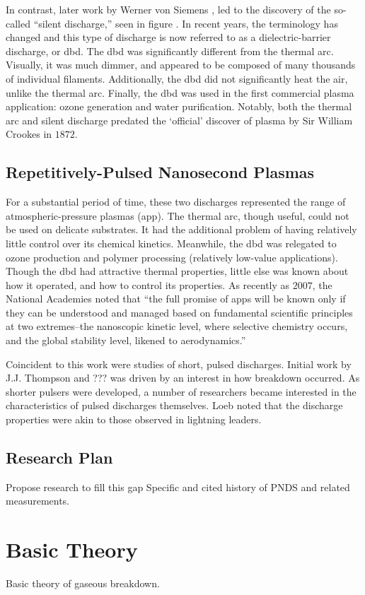 In contrast, later work by Werner von Siemens  , led to the
discovery of the so-called ``silent discharge,'' seen in figure
\missingfigure{}. In recent years, the terminology has changed and this type of
discharge is now referred to as a dielectric-barrier discharge, or \acs{dbd}.
The \acs{dbd} was significantly different from the thermal arc. Visually, it was
much dimmer, and appeared to be composed of many thousands of individual
filaments. Additionally, the \acs{dbd} did not significantly heat the air,
unlike the thermal arc. Finally, the \acs{dbd} was used in the first commercial
plasma application: ozone generation and water purification. Notably, both the
thermal arc and silent discharge predated the `official' discover of plasma by
Sir William Crookes in $1872$.

\subsection{Repetitively-Pulsed Nanosecond Plasmas}

For a substantial period of time, these two  discharges
represented the range of atmospheric-pressure plasmas (\acs{app}). The thermal
arc, though useful, could not be used on delicate substrates. It had the
additional problem of having relatively little control over its chemical
kinetics. Meanwhile, the \acs{dbd} was relegated to ozone production and polymer
processing (relatively low-value applications). Though the \acs{dbd} had
attractive thermal properties, little else was known about how it operated, and
how to control its properties. As recently as $2007$, the National Academies
noted that ``the full promise of \acs{app}s will be known only if they can be
understood and managed based on fundamental scientific principles at two
extremes--the nanoscopic kinetic level, where selective chemistry occurs, and
the global stability level, likened to aerodynamics.''

Coincident to this work were studies of short, pulsed discharges. Initial work
by J.J. Thompson and ???  was driven by an interest in
how breakdown occurred. As shorter pulsers were developed, a number of
researchers became interested in the characteristics of pulsed discharges
themselves. Loeb  noted that the discharge properties were akin
to those observed in lightning leaders. 

\subsection{Research Plan}

Propose research to fill this gap
Specific and cited history of PNDS and related measurements.

\section{Basic Theory}

Basic theory of gaseous breakdown.
